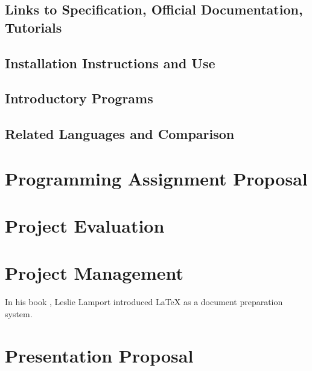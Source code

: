 \documentclass{article}
\begin{document}
\subsection{Links to Specification, Official Documentation, Tutorials}

\subsection{Installation Instructions and Use}

\subsection{Introductory Programs}

\subsection{Related Languages and Comparison}

\section{Programming Assignment Proposal}

\section{Project Evaluation}

\section{Project Management}
In his book \cite{lamport94}, Leslie Lamport introduced LaTeX as a document preparation system.

\section{Presentation Proposal}
\end{document}
